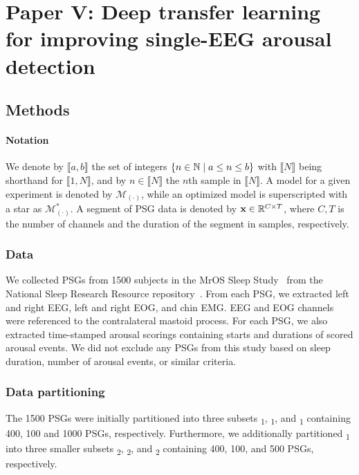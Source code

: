 \section{Paper V: Deep transfer learning for improving single-EEG arousal detection}\label{sec:paperv}

\subsection{Methods}

\paragraph*{Notation} We denote by \(\llbracket a, b \rrbracket\) the set of integers \(\lbrace n \in \mathbb{N} \mid a \leq n \leq b\rbrace\) with \(\llbracket N \rrbracket\) being shorthand for \(\llbracket 1, N \rrbracket\), and by \(n \in \llbracket N \rrbracket \) the \(n\)th sample in \(\llbracket N \rrbracket\).
A model for a given experiment is denoted by $\mathcal{M}_{(\cdot)}$, while an optimized model is superscripted with a star as $\mathcal{M}_{(\cdot)}^{*}$.
A segment of PSG data is denoted by $\mathbf{x} \in \mathbb{R}^{C \times T}$, where $C, T$ is the number of channels and the duration of the segment in samples, respectively.

\subsubsection{Data}
We collected PSGs from \num{1500} subjects in the MrOS Sleep Study~\cite{Blank2005, Orwoll2005, Blackwell2011} from the National Sleep Research Resource repository~\cite{Dean2016, Zhang2018}.
From each PSG, we extracted left and right EEG, left and right EOG, and chin EMG.
EEG and EOG channels were referenced to the contralateral mastoid process.
For each PSG, we also extracted time-stamped arousal scorings containing starts and durations of scored arousal events.
We did not exclude any PSGs from this study based on sleep duration, number of arousal events, or similar criteria.

\subsubsection{Data partitioning}
The 1500 PSGs were initially partitioned into three subsets \train\textsubscript{1}, \eval\textsubscript{1}, and \test\textsubscript{1} containing 400, 100 and 1000 PSGs, respectively.
Furthermore, we additionally partitioned \test\textsubscript{1} into three smaller subsets \train\textsubscript{2}, \eval\textsubscript{2}, and \test\textsubscript{2} containing 400, 100, and 500 PSGs, respectively.

